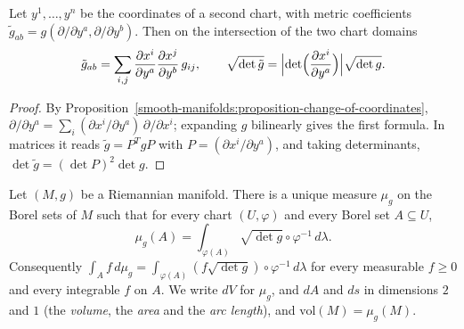 \begin{lemma}\label{riemannian-geometry:lemma-metric-change-of-chart}
Let $y^1, \ldots, y^n$ be the coordinates of a second chart, with metric coefficients $\tilde g_{ab} = g(\partial/\partial y^a, \partial/\partial y^b)$. Then on the
intersection of the two chart domains
\[
\tilde g_{ab} = \sum_{i,j}\frac{\partial x^i}{\partial y^a}\frac{\partial x^j}{\partial y^b}\,g_{ij}, \qquad
\sqrt{\det\tilde g} = \Bigl|\det\Bigl(\frac{\partial x^i}{\partial y^a}\Bigr)\Bigr|\sqrt{\det g}.
\]
\end{lemma}

\begin{proof}
By Proposition~\ref{smooth-manifolds:proposition-change-of-coordinates}, $\partial/\partial y^a = \sum_i(\partial x^i/\partial y^a)\,\partial/\partial x^i$; expanding
$g$ bilinearly gives the first formula. In matrices it reads $\tilde g = P^TgP$ with $P = (\partial x^i/\partial y^a)$, and taking determinants,
$\det\tilde g = (\det P)^2\det g$.
\end{proof}

\begin{proposition}\label{riemannian-geometry:proposition-riemannian-measure}
Let $(M, g)$ be a Riemannian manifold. There is a unique measure $\mu_g$ on the Borel sets of $M$ such that for every chart $(U, \varphi)$ and every Borel set
$A \subseteq U$,
\[
\mu_g(A) = \int_{\varphi(A)}\sqrt{\det g} \circ \varphi^{-1}\,d\lambda .
\]
Consequently $\int_Af\,d\mu_g = \int_{\varphi(A)}(f\sqrt{\det g}) \circ \varphi^{-1}\,d\lambda$ for every measurable $f \geq 0$ and every integrable $f$ on $A$. We write $dV$ for
$\mu_g$, and $dA$ and $ds$ in dimensions $2$ and $1$ (the \emph{volume}, the \emph{area} and the \emph{arc length}), and $\mathrm{vol}(M) = \mu_g(M)$.
\end{proposition}

